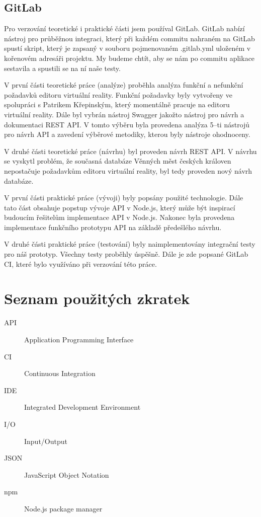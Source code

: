 \documentclass[thesis=B,czech]{FITthesis}[2012/06/26]
\begin{document}
    \section{GitLab}
        Pro verzování teoretické i praktické části jsem používal GitLab. GitLab nabízí nástroj pro průběžnou integraci, který při každém commitu nahraném na GitLab spustí skript, který je zapsaný v souboru pojmenovaném .gitlab.yml uloženém v kořenovém adresáři projektu. My budeme chtít, aby se nám po commitu aplikace sestavila a spustili se na ní naše testy.

\begin{conclusion}
    V první části teoretické práce (analýze) proběhla analýza funkční a nefunkční požadavků editoru virtuální reality. Funkční požadavky byly vytvořeny ve spolupráci s Patrikem Křepinským, který momentálně pracuje na editoru virtuální reality.
	Dále byl vybrán nástroj Swagger jakožto nástroj pro návrh a dokumentaci REST API. V tomto výběru byla provedena analýza 5--ti nástrojů pro návrh API a zavedení výběrové metodiky, kterou byly nástroje ohodnoceny.
	
	
	V druhé části teoretické práce (návrhu) byl proveden návrh REST API. V návrhu se vyskytl problém, že současná databáze Věnných měst českých královen nepostačuje požadavkům editoru virtuální reality, byl tedy proveden nový návrh databáze.
	
	
	V první části praktické práce (vývoji) byly popsány použité technologie. Dále tato část obsahuje popstup vývoje API v Node.js, který může být inspirací budoucím řešitelům implementace API v Node.js. Nakonec byla provedena implementace funkčního prototypu API na základě předešlého návrhu.
	
	
	V druhé části praktické práce (testování) byly naimplementovány integrační testy pro náš prototyp. Všechny testy proběhly úspěšně. Dále je zde popsané GitLab CI, které bylo využíváno při verzování této práce.

\end{conclusion}




\appendix

\chapter{Seznam použitých zkratek}
\begin{description}
	\item[API] Application Programming Interface
	\item[CI] Continuous Integration
	\item[IDE] Integrated Development Environment
	\item[I/O] Input/Output
	\item[JSON] JavaScript Object Notation
	\item[npm] Node.js package manager
\end{description}
\end{document}
